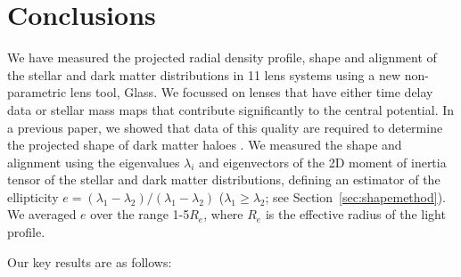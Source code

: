 \documentclass[useAMS,usenatbib]{mn2e}
\def\Glass{{\sc Glass}}
\begin{document}
\section{Conclusions}\label{sec:conclusions}
We have measured the projected radial density profile, shape and alignment of the stellar and dark matter distributions in 11 lens systems using a new non-parametric lens tool, \Glass. We focussed on lenses that have either time delay data or stellar mass maps that contribute significantly to the central potential. In a previous paper, we showed that data of this quality are required to determine the projected shape of dark matter haloes \citep{2014MNRAS.445.2181C}. We measured the shape and alignment using the eigenvalues $\lambda_i$ and eigenvectors of the 2D moment of inertia tensor of the stellar and dark matter distributions, defining an estimator of the ellipticity $e = (\lambda_{1}-\lambda_{2})/(\lambda_{1}-\lambda_{2})$ ($\lambda_{1} \geq \lambda_{2}$; see Section~\ref{sec:shapemethod}). We averaged $e$ over the range 1-5$R_e$, where $R_e$ is the effective radius of the light profile.

Our key results are as follows:
\end{document}
